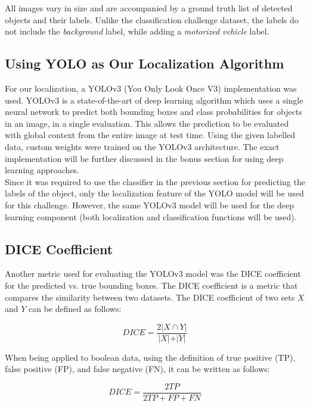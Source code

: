 \documentclass[12pt]{article}
\begin{document}
All images vary in size and are accompanied by a ground truth list of detected objects and their labels. Unlike the classification challenge dataset, the labels do not include the \textit{background} label, while adding a \textit{motorized vehicle} label. 

\subsection{Using YOLO as Our Localization Algorithm}

For our localization, a YOLOv3 (You Only Look Once V3) \cite{YOLO} implementation was used. YOLOv3 is a state-of-the-art of deep learning algorithm which uses a single neural network to predict both bounding boxes and class probabilities for objects in an image, in a single evaluation. This allows the prediction to be evaluated with global context from the entire image at test time. Using the given labelled data, custom weights were trained on the YOLOv3 architecture. The exact implementation will be further discussed in the bonus section for using deep learning approaches. \\

Since it was required to use the classifier in the previous section for predicting the labels of the object, only the localization feature of the YOLO model will be used for this challenge. However, the same YOLOv3 model will be used for the deep learning component (both localization and classification functions will be used).

\subsection{DICE Coefficient}

Another metric used for evaluating the YOLOv3 model was the DICE coefficient for the predicted vs. true bounding boxes. The DICE coefficient is a metric that compares the similarity between two datasets. The DICE coefficient of two sets $X$ and $Y$ can be defined as follows:  

\begin{equation}
    DICE = \frac{2 \rvert X \cap Y \rvert} 
            {\rvert X \rvert + \rvert Y \rvert} 
\end{equation}

When being applied to boolean data, using the definition of true positive (TP), false positive (FP), and false negative (FN), it can be written as follows:

\begin{equation}
    DICE = \frac{2TP}{2TP + FP + FN} 
\end{equation}
\end{document}
